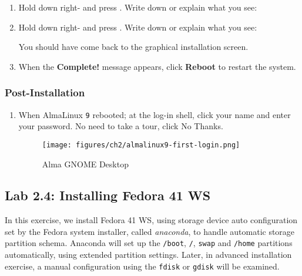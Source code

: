 \begin{enumerate}
\vspace{0.35in}

\item Hold down right-{} and press {}. Write down or explain what you see:

\vspace{0.50in}

\item {\label{stop:l2.3}} Hold down right-{} and press {}. Write down or explain what you see:

\vspace{0.50in}

You should have come back to the graphical installation screen.     

\item When the {\bf{Complete!}} message appears, click {\bf{Reboot}} to restart the system.

\end{enumerate}

\subsubsection*{Post-Installation}

\begin{enumerate}
\item When AlmaLinux {\tt{9}} rebooted; at the log-in shell, click your name and enter your password. No need to take a tour, click No Thanks. 

\begin{figure}[hbt!]\centering
   \texttt{[image: figures/ch2/almalinux9-first-login.png]}
   \caption{Alma GNOME Desktop} \label{fig:almalinux9-gnome} %
\end{figure}

\end{enumerate} 

%
%
\subsection*{Lab 2.4: Installing Fedora 41 WS} 

In this exercise, we install Fedora 41 WS, using storage device auto configuration set by the Fedora system installer, called {\it{anaconda}}, to handle automatic storage partition schema. Anaconda will set up the {\tt{/boot}}, {\tt{/}}, {\tt{swap}} and {\tt{/home}} partitions automatically, using extended partition settings. Later, in advanced installation exercise, a manual configuration using the {\tt{fdisk}} or {\tt{gdisk}} will be examined. 

